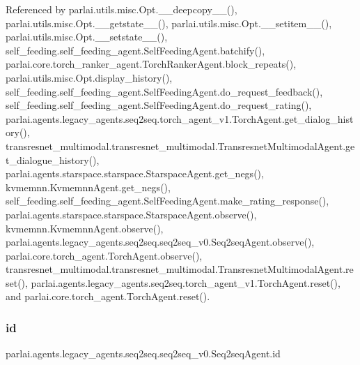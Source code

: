 Referenced by parlai.\+utils.\+misc.\+Opt.\+\_\+\+\_\+deepcopy\+\_\+\+\_\+(), parlai.\+utils.\+misc.\+Opt.\+\_\+\+\_\+getstate\+\_\+\+\_\+(), parlai.\+utils.\+misc.\+Opt.\+\_\+\+\_\+setitem\+\_\+\+\_\+(), parlai.\+utils.\+misc.\+Opt.\+\_\+\+\_\+setstate\+\_\+\+\_\+(), self\+\_\+feeding.\+self\+\_\+feeding\+\_\+agent.\+Self\+Feeding\+Agent.\+batchify(), parlai.\+core.\+torch\+\_\+ranker\+\_\+agent.\+Torch\+Ranker\+Agent.\+block\+\_\+repeats(), parlai.\+utils.\+misc.\+Opt.\+display\+\_\+history(), self\+\_\+feeding.\+self\+\_\+feeding\+\_\+agent.\+Self\+Feeding\+Agent.\+do\+\_\+request\+\_\+feedback(), self\+\_\+feeding.\+self\+\_\+feeding\+\_\+agent.\+Self\+Feeding\+Agent.\+do\+\_\+request\+\_\+rating(), parlai.\+agents.\+legacy\+\_\+agents.\+seq2seq.\+torch\+\_\+agent\+\_\+v1.\+Torch\+Agent.\+get\+\_\+dialog\+\_\+history(), transresnet\+\_\+multimodal.\+transresnet\+\_\+multimodal.\+Transresnet\+Multimodal\+Agent.\+get\+\_\+dialogue\+\_\+history(), parlai.\+agents.\+starspace.\+starspace.\+Starspace\+Agent.\+get\+\_\+negs(), kvmemnn.\+Kvmemnn\+Agent.\+get\+\_\+negs(), self\+\_\+feeding.\+self\+\_\+feeding\+\_\+agent.\+Self\+Feeding\+Agent.\+make\+\_\+rating\+\_\+response(), parlai.\+agents.\+starspace.\+starspace.\+Starspace\+Agent.\+observe(), kvmemnn.\+Kvmemnn\+Agent.\+observe(), parlai.\+agents.\+legacy\+\_\+agents.\+seq2seq.\+seq2seq\+\_\+v0.\+Seq2seq\+Agent.\+observe(), parlai.\+core.\+torch\+\_\+agent.\+Torch\+Agent.\+observe(), transresnet\+\_\+multimodal.\+transresnet\+\_\+multimodal.\+Transresnet\+Multimodal\+Agent.\+reset(), parlai.\+agents.\+legacy\+\_\+agents.\+seq2seq.\+torch\+\_\+agent\+\_\+v1.\+Torch\+Agent.\+reset(), and parlai.\+core.\+torch\+\_\+agent.\+Torch\+Agent.\+reset().

\mbox{\label{classparlai_1_1agents_1_1legacy__agents_1_1seq2seq_1_1seq2seq__v0_1_1Seq2seqAgent_a616955265cd96254aae5b5958ac18159}} 
\subsubsection{\texorpdfstring{id}{id}}
{\footnotesize\ttfamily parlai.\+agents.\+legacy\+\_\+agents.\+seq2seq.\+seq2seq\+\_\+v0.\+Seq2seq\+Agent.\+id}




